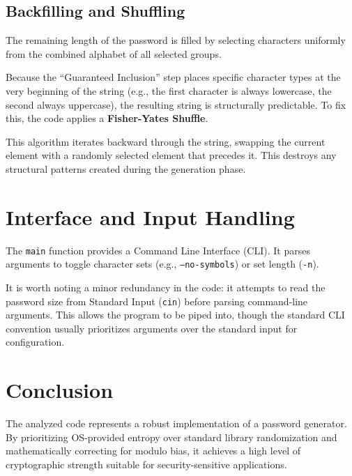 \documentclass[conference]{IEEEtran}
\begin{document}
\subsection{Backfilling and Shuffling}
The remaining length of the password is filled by selecting characters uniformly from the combined alphabet of all selected groups.

Because the ``Guaranteed Inclusion'' step places specific character types at the very beginning of the string (e.g., the first character is always lowercase, the second always uppercase), the resulting string is structurally predictable. To fix this, the code applies a \textbf{Fisher-Yates Shuffle}.

This algorithm iterates backward through the string, swapping the current element with a randomly selected element that precedes it. This destroys any structural patterns created during the generation phase.

\section{Interface and Input Handling}
The \texttt{main} function provides a Command Line Interface (CLI). It parses arguments to toggle character sets (e.g., \texttt{--no-symbols}) or set length (\texttt{-n}).

It is worth noting a minor redundancy in the code: it attempts to read the password size from Standard Input (\texttt{cin}) before parsing command-line arguments. This allows the program to be piped into, though the standard CLI convention usually prioritizes arguments over the standard input for configuration.

\section{Conclusion}
The analyzed code represents a robust implementation of a password generator. By prioritizing OS-provided entropy over standard library randomization and mathematically correcting for modulo bias, it achieves a high level of cryptographic strength suitable for security-sensitive applications.
\end{document}
